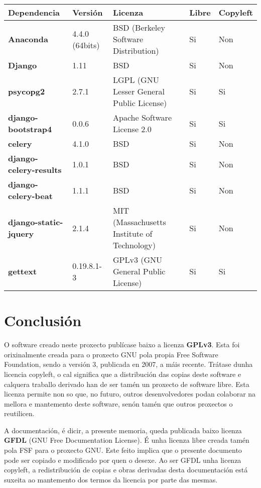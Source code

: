 \begin{longtable}{|p{3cm}|p{1.5cm}|p{5.5cm}|p{1cm}|p{1.5cm}|}
	\hline
	\rowcolor{gray!50}
	Dependencia & Versión & Licenza & Libre & Copyleft \\
	\hline
	\textbf{Anaconda} & 4.4.0 (64bits) & BSD (Berkeley Software Distribution) & Si & Non \\
	\hline
	\textbf{Django} & 1.11 & BSD & Si & Non \\
	\hline
	\textbf{psycopg2} & 2.7.1 & LGPL (GNU Lesser General Public License) & Si & Si \\	
	\hline
	\textbf{django-bootstrap4} & 0.0.6 & Apache Software License 2.0 & Si & Si\\
	\hline
	\textbf{celery} & 4.1.0 & BSD & Si & Non \\
	\hline
	\textbf{django-celery-results} & 1.0.1 & BSD & Si & Non \\
	\hline
	\textbf{django-celery-beat} & 1.1.1 & BSD & Si & Non \\
	\hline
	\textbf{django-static-jquery} & 2.1.4 & MIT (Massachusetts Institute of Technology) & Si & Non \\
	\hline
	\textbf{gettext} & 0.19.8.1-3 & GPLv3 (GNU General Public License) & Si & Si \\
	\hline
\end{longtable}


\section{Conclusión}

O software creado neste proxecto publícase baixo a licenza \textbf{GPLv3}. Esta foi orixinalmente creada para o proxecto GNU pola propia Free Software Foundation, sendo a versión 3, publicada en 2007, a máis recente. Trátase dunha licencia copyleft, o cal significa que a distribución das copias deste software e calquera traballo derivado han de ser tamén un proxecto de software libre. Esta licenza permite non so que, no futuro, outros desenvolvedores podan colaborar na mellora e mantemento deste software, senón tamén que outros proxectos o reutilicen.

A documentación, é dicir, a presente memoria, queda publicada baixo licenza \textbf{GFDL} (GNU Free Documentation License). É unha licenza libre creada tamén pola FSF para o proxecto GNU. Este feito implica que o presente documento pode ser copiado e modificado por quen o desexe. Ao ser GFDL unha licenza copyleft, a redistribución de copias e obras derivadas desta documentación está suxeita ao mantemento dos termos da licencia por parte das mesmas.

